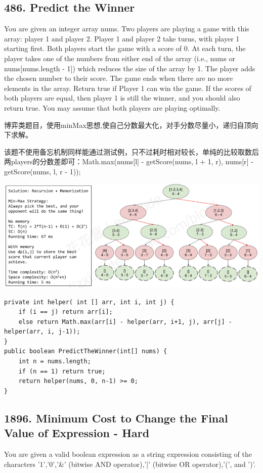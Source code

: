 \documentclass[9pt, b5paaper]{book}
\begin{document}
\subsection{486. Predict the Winner}
\label{sec-1-4-42}
You are given an integer array nums. Two players are playing a game with this array: player 1 and player 2.
Player 1 and player 2 take turns, with player 1 starting first. Both players start the game with a score of 0. At each turn, the player takes one of the numbers from either end of the array (i.e., nums\footnotemark[1]{} or nums[nums.length - 1]) which reduces the size of the array by 1. The player adds the chosen number to their score. The game ends when there are no more elements in the array.
Return true if Player 1 can win the game. If the scores of both players are equal, then player 1 is still the winner, and you should also return true. You may assume that both players are playing optimally.

博弈类题目，使用minMax思想,使自己分数最大化，对手分数尽量小，递归自顶向下求解。

该题不使用备忘机制同样能通过测试例，只不过耗时相对较长，单纯的比较取数后两players的分数差即可：Math.max(nums[l] - getScore(nums, l + 1, r), nums[r] - getScore(nums, l, r - 1));

\includegraphics[width=.9\linewidth]{./pic/predictWinner.png}

\begin{verbatim}
private int helper( int [] arr, int i, int j) {
    if (i == j) return arr[i];
    else return Math.max(arr[i] - helper(arr, i+1, j), arr[j] - helper(arr, i, j-1));
}
public boolean PredictTheWinner(int[] nums) {
    int n = nums.length;
    if (n == 1) return true;
    return helper(nums, 0, n-1) >= 0;
}
\end{verbatim}

\subsection{1896. Minimum Cost to Change the Final Value of Expression - Hard}
\label{sec-1-4-43}
You are given a valid boolean expression as a string expression consisting of the characters '1','0','\&' (bitwise AND operator),'|' (bitwise OR operator),'(', and ')'.
\end{document}
